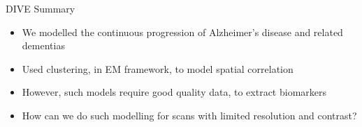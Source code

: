 \begin{frame}{DIVE Summary}

\begin{itemize}
 \item We modelled the continuous progression of Alzheimer's disease and related dementias
 
 \vo
 
 \item Used clustering, in EM framework, to model spatial correlation
 
 \vo
 
 \item However, such models require good quality data, to extract biomarkers
 
 \vo
 
 \item How can we do such modelling for scans with limited resolution and contrast?
\end{itemize}

 
\end{frame}


% 
% 
% 
% 
% 
% 


% 
% 
% 
% 
% 
% 
% 


